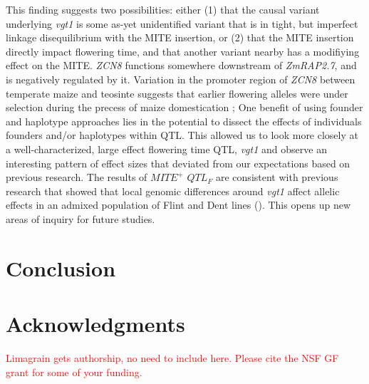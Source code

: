 \documentclass[article,9pt,twocolumn,twoside]{rilabRxiv}
\newcommand{\jri}[1]{{\small \textcolor{red}{#1}}}
\begin{document}
This finding suggests two possibilities: either (1) that the causal variant underlying \emph{vgt1} is some as-yet unidentified variant that is in tight, but imperfect linkage disequilibrium with the MITE insertion, or (2) that the MITE insertion directly impact flowering time, and that another variant nearby has a modifiying effect on the MITE.
\emph{ZCN8} functions somewhere downstream of \emph{ZmRAP2.7}, and is negatively regulated by it.
Variation in the promoter region of \emph{ZCN8} between temperate maize and teosinte suggests that earlier flowering alleles were under selection during the precess of maize domestication \citep{Guo};\citep{Bouchet}
One benefit of using founder and haplotype approaches lies in the potential to dissect the effects of individuals founders and/or haplotypes within QTL.
This allowed us to look more closely at a well-characterized, large effect flowering time QTL, \emph{vgt1} and observe an interesting pattern of effect sizes that deviated from our expectations based on previous research.
The results of $MITE^+$ $QTL_F$ are consistent with previous research that showed that local genomic differences around \emph{vgt1} affect allelic effects in an admixed population of Flint and Dent lines (\cite{Rio}).
This opens up new areas of inquiry for future studies.


\section{Conclusion}



\section{Acknowledgments}
\jri{Limagrain gets  authorship, no need to include here. Please cite the  NSF GF grant for some of your funding.}


\end{document}
